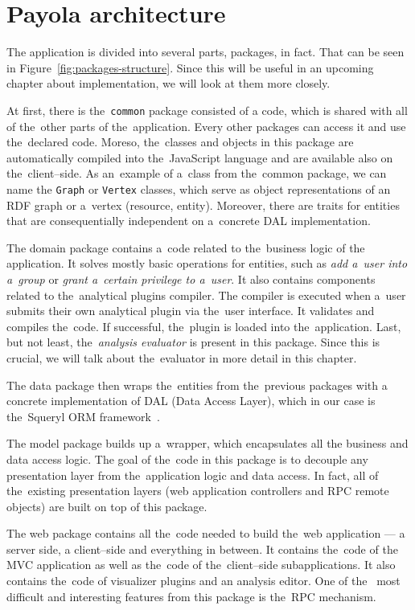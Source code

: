 \section{Payola architecture}
The application is divided into several parts, packages, in fact. That can be 
seen in Figure~\ref{fig:packages-structure}. Since this will be useful in an upcoming
chapter about implementation, we will look at them more closely.

At first, there is the~\texttt{common} package consisted of a code, which is 
shared with all of the~other parts of the~application. Every other packages can 
access it and use the~declared code. Moreso, the~classes and objects 
in this package are automatically compiled into the~JavaScript language and are available
also on the~client--side. As an~example of a~class from the~common package, we
can name the \texttt{Graph} or \texttt{Vertex} classes, which serve as object representations
of an RDF graph or a~vertex (resource, entity). Moreover, there are traits for 
entities that are consequentially independent on a~concrete DAL implementation.

The domain package contains a~code related to the~business logic of the~
application. It solves mostly basic operations for entities, such as
\emph{add a~user into a~group} or \emph{grant a~certain privilege to a~user}.
It also contains components related to the~analytical plugins compiler. The 
compiler is executed when a~user submits their own analytical plugin via the~user 
interface. It validates and compiles the~code. If successful, the~plugin is 
loaded into the~application. Last, but not least, the~\emph{analysis evaluator} is 
present in this package. Since this is crucial, we will talk about the~evaluator
in more detail in this chapter.

The data package then wraps the~entities from the~previous packages with a
concrete implementation of DAL (Data Access Layer), which in our case is the~Squeryl
ORM framework~\cite{squeryl}.

The model package builds up a~wrapper, which encapsulates all the
business and data access logic. The goal of the~code in this package is to decouple
any presentation layer from the~application logic and data access. In fact,
all of the~existing presentation layers (web application controllers and
RPC remote objects) are built on top of this package. 

The web package contains all the~code needed to build the~web application --- 
a server side, a client--side and everything in between. It contains the~code of 
the MVC application as well as the~code of the~client--side subapplications.
It also contains the~code of visualizer plugins and an analysis editor. One of the~
most difficult and interesting features from this package is the~RPC mechanism.

